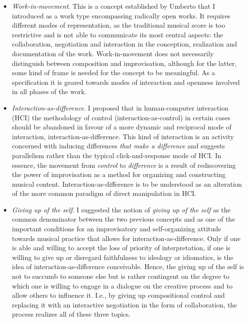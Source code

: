 \documentclass[a4paper,hidelinks]{article}
\begin{document}
\begin{itemize}
\item \emph{Work-in-movement}. This is a concept established by Umberto \citet{eco68} that I introduced as a work type encompassing radically open works. It requires different modes of representation, as the traditional musical score is too restrictive and is not able to communicate its most central aspects: the collaboration, negotiation and interaction in the conception, realization and documentation of the work. Work-in-movement does not necessarily distinguish between composition and improvisation, although for the latter, some kind of frame is needed for the concept to be meaningful. As a specification it is geared towards modes of interaction and openness involved in all phases of the work.

\item \emph{Interaction-as-difference}. I proposed that in human-computer interaction (HCI) the methodology of control (interaction-as-control) in certain cases should be abandoned in favour of a more dynamic and reciprocal mode of interaction, interaction-as-difference. This kind of interaction is an activity concerned with inducing differences \emph{that make a difference} \citep{bateson72:steps} and suggests parallelism rather than the typical click-and-response mode of HCI. In essence, the movement from \emph{control} to \emph{difference} is a result of rediscovering the power of improvisation as a method for organizing and constructing musical content. Interaction-as-difference is to be understood as an alteration of the more common paradigm of direct manipulation in HCI.
 
\item \emph{Giving up of the self}. I suggested the notion of \emph{giving up of the self} as the common denominator between the two previous concepts and as one of the important conditions for an improvisatory and self-organizing attitude towards musical practice that allows for interaction-as-difference. Only if one is able and willing to accept the loss of priority of interpretation, if one is willing to give up or disregard faithfulness to ideology or idiomatics, is the idea of interaction-as-difference conceivable. Hence, the giving up of the self is not to succumb to someone else but is rather contingent on the degree to which one is willing to engage in a dialogue on the creative process and to allow others to influence it. I.e., by giving up compositional control and replacing it with an interactive negotiation in the form of collaboration, the process realizes all of these three topics.
\end{itemize}
\end{document}
